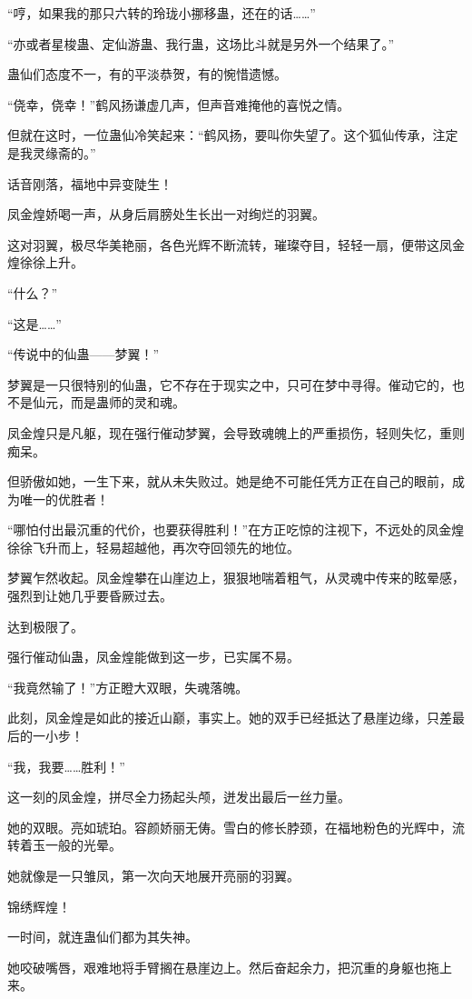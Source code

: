 \begin{this_body}
“哼，如果我的那只六转的玲珑小挪移蛊，还在的话……”

“亦或者星梭蛊、定仙游蛊、我行蛊，这场比斗就是另外一个结果了。”

蛊仙们态度不一，有的平淡恭贺，有的惋惜遗憾。

“侥幸，侥幸！”鹤风扬谦虚几声，但声音难掩他的喜悦之情。

但就在这时，一位蛊仙冷笑起来：“鹤风扬，要叫你失望了。这个狐仙传承，注定是我灵缘斋的。”

话音刚落，福地中异变陡生！

凤金煌娇喝一声，从身后肩膀处生长出一对绚烂的羽翼。

这对羽翼，极尽华美艳丽，各色光辉不断流转，璀璨夺目，轻轻一扇，便带这凤金煌徐徐上升。

“什么？”

“这是……”

“传说中的仙蛊——梦翼！”

梦翼是一只很特别的仙蛊，它不存在于现实之中，只可在梦中寻得。催动它的，也不是仙元，而是蛊师的灵和魂。

凤金煌只是凡躯，现在强行催动梦翼，会导致魂魄上的严重损伤，轻则失忆，重则痴呆。

但骄傲如她，一生下来，就从未失败过。她是绝不可能任凭方正在自己的眼前，成为唯一的优胜者！

“哪怕付出最沉重的代价，也要获得胜利！”在方正吃惊的注视下，不远处的凤金煌徐徐飞升而上，轻易超越他，再次夺回领先的地位。

梦翼乍然收起。凤金煌攀在山崖边上，狠狠地喘着粗气，从灵魂中传来的眩晕感，强烈到让她几乎要昏厥过去。

达到极限了。

强行催动仙蛊，凤金煌能做到这一步，已实属不易。

“我竟然输了！”方正瞪大双眼，失魂落魄。

此刻，凤金煌是如此的接近山巅，事实上。她的双手已经抵达了悬崖边缘，只差最后的一小步！

“我，我要……胜利！”

这一刻的凤金煌，拼尽全力扬起头颅，迸发出最后一丝力量。

她的双眼。亮如琥珀。容颜娇丽无俦。雪白的修长脖颈，在福地粉色的光辉中，流转着玉一般的光晕。

她就像是一只雏凤，第一次向天地展开亮丽的羽翼。

锦绣辉煌！

一时间，就连蛊仙们都为其失神。

她咬破嘴唇，艰难地将手臂搁在悬崖边上。然后奋起余力，把沉重的身躯也拖上来。


\end{this_body}
